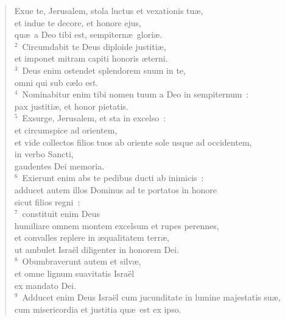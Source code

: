 \begin{flushleft}\begin{verse}\vspace{-19pt}Exue te, Jerusalem, stola luctus et vexationis tu\ae ,\\ et indue te decore, et honore ejus,\\ qu\ae\ a Deo tibi est, sempitern\ae\ glori\ae .\\
${}^{2}$~Circumdabit te Deus diploide justiti\ae ,\\ et imponet mitram capiti honoris \ae terni.\\
${}^{3}$~Deus enim ostendet splendorem suum in te,\\ omni qui sub c\ae lo est.\\
${}^{4}$~Nominabitur enim tibi nomen tuum a Deo in sempiternum~:\\ pax justiti\ae , et honor pietatis.\\
${}^{5}$~Exsurge, Jerusalem, et sta in excelso~:\\ et circumspice ad orientem,\\ et vide collectos filios tuos ab oriente sole usque ad occidentem,\\ in verbo Sancti,\\ gaudentes Dei memoria.\\
${}^{6}$~Exierunt enim abs te pedibus ducti ab inimicis~:\\ adducet autem illos Dominus ad te portatos in honore\\ sicut filios regni~:\\
${}^{7}$~constituit enim Deus\\ humiliare omnem montem excelsum et rupes perennes,\\ et convalles replere in \ae qualitatem terr\ae ,\\ ut ambulet Isra\"el diligenter in honorem Dei.\\
${}^{8}$~Obumbraverunt autem et silv\ae ,\\ et omne lignum suavitatis Isra\"el\\ ex mandato Dei.\\
${}^{9}$~Adducet enim Deus Isra\"el cum jucunditate in lumine majestatis su\ae ,\\ cum misericordia et justitia qu\ae\ est ex ipso.\end{verse}\end{flushleft}



